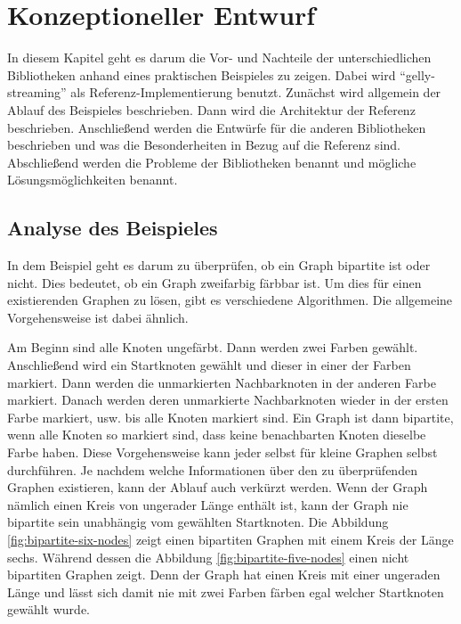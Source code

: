 \chapter{Konzeptioneller Entwurf}
In diesem Kapitel geht es darum die Vor- und Nachteile der unterschiedlichen
Bibliotheken anhand eines praktischen Beispieles zu zeigen. Dabei wird
\enquote{gelly-streaming} als Referenz-Implementierung benutzt. Zunächst wird
allgemein der Ablauf des Beispieles beschrieben. Dann wird die Architektur
der Referenz beschrieben. Anschließend werden die Entwürfe für die anderen
Bibliotheken beschrieben und was die Besonderheiten in Bezug auf die Referenz
sind. Abschließend werden die Probleme der Bibliotheken benannt und mögliche
Lösungsmöglichkeiten benannt.

\section{Analyse des Beispieles}
In dem Beispiel geht es darum zu überprüfen, ob ein Graph bipartite ist oder
nicht. Dies bedeutet, ob ein Graph zweifarbig färbbar ist. Um dies für einen
existierenden Graphen zu lösen, gibt es verschiedene Algorithmen. Die allgemeine
Vorgehensweise ist dabei ähnlich.

Am Beginn sind alle Knoten ungefärbt. Dann werden zwei Farben gewählt.
Anschließend wird ein Startknoten gewählt und dieser in einer der Farben markiert.
Dann werden die unmarkierten Nachbarknoten in der anderen Farbe markiert. Danach
werden deren unmarkierte Nachbarknoten wieder in der ersten Farbe markiert, usw.
bis alle Knoten markiert sind. Ein Graph ist dann bipartite, wenn alle Knoten so
markiert sind, dass keine benachbarten Knoten dieselbe Farbe haben. Diese
Vorgehensweise kann jeder selbst für kleine Graphen selbst durchführen. Je nachdem
welche Informationen über den zu überprüfenden Graphen existieren, kann der Ablauf
auch verkürzt werden. Wenn der Graph nämlich einen Kreis von ungerader Länge
enthält ist, kann der Graph nie bipartite sein unabhängig vom gewählten
Startknoten. Die Abbildung \ref{fig:bipartite-six-nodes} zeigt einen bipartiten
Graphen mit einem Kreis der Länge sechs. Während dessen die Abbildung \ref{fig:bipartite-five-nodes}
einen nicht bipartiten Graphen zeigt. Denn der Graph hat einen Kreis mit einer
ungeraden Länge und lässt sich damit nie mit zwei Farben färben egal welcher
Startknoten gewählt wurde. 

